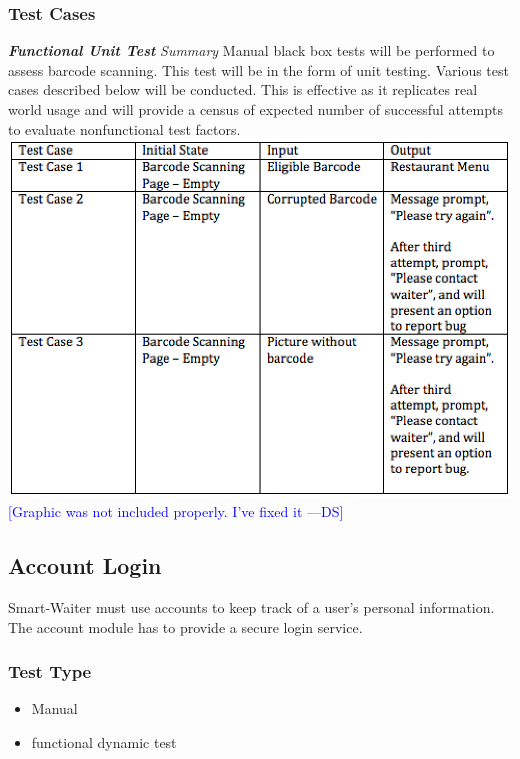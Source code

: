 \documentclass[12pt]{article}
\newcommand{\authornote}[3]{\textcolor{#1}{[#3 ---#2]}}
\newcommand{\authornote}[3]{}
\newcommand{\ds}[1]{\authornote{blue}{DS}{#1}}
\begin{document}
\subsubsection{Test Cases}
\textbf{\textit{Functional Unit Test}}\newline
\newline
\textit{Summary}\newline
Manual black box tests will be performed to assess barcode scanning. This test will be in the form of unit testing. Various test cases described below will be conducted. This is effective as it replicates real world usage and will provide a census of expected number of successful attempts to evaluate nonfunctional test factors.
\newline
\includegraphics[width=\textwidth,height=\textheight,keepaspectratio]{barcode.png}\newline
\ds{Graphic was not included properly. I've fixed it}

\subsection{Account Login}
Smart-Waiter must use accounts to keep track of a user's personal information. The account module has to provide a secure login service. 
\subsubsection{Test Type}
\begin{itemize}
  \item Manual
  \item functional dynamic test
\end{itemize}
\end{document}
